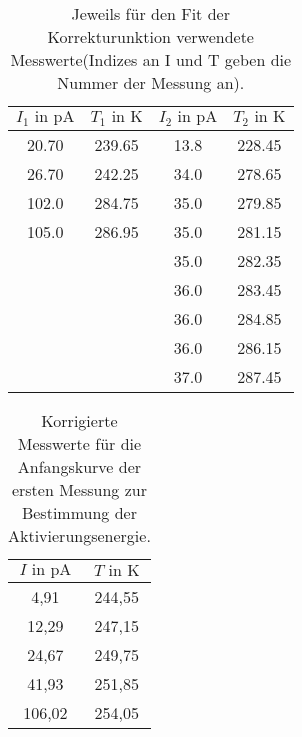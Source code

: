 \FloatBarrier
\begin{table}
  \centering
  \caption{Jeweils für den Fit der Korrekturunktion verwendete Messwerte(Indizes an I und T geben die Nummer der Messung an).}
  \label{tab:korrekturfit}
    \begin{tabular}{c c c c}
      \toprule
      $I_{1} \text{ in } \si{\pico\ampere}$ & $ T_{1} \text{ in } \si{\kelvin} $ & $I_{2} \text{ in } \si{\pico\ampere}$ & $ T_{2} \text{ in } \si{\kelvin} $ \\
      \midrule
      20.70 & 239.65 & 13.8 & 228.45\\
      26.70 & 242.25 & 34.0 & 278.65\\
      102.0 & 284.75 & 35.0 & 279.85\\
      105.0 & 286.95 & 35.0 & 281.15\\
            &        & 35.0 & 282.35\\
            &        & 36.0 & 283.45\\
            &        & 36.0 & 284.85\\
            &        & 36.0 & 286.15\\
            &        & 37.0 & 287.45\\
      \bottomrule
    \end{tabular}
\end{table}


\begin{table}
  \centering
  \caption{Korrigierte Messwerte für die Anfangskurve der ersten Messung zur Bestimmung der Aktivierungsenergie.}
  \label{tab:linfit1}
    \begin{tabular}{c c}
      \toprule
      $I \text{ in } \si{\pico\ampere}$ & $ T \text{ in } \si{\kelvin} $ \\
      \midrule
        4,91 & 244,55\\
       12,29 & 247,15\\
       24,67 & 249,75\\
       41,93 & 251,85\\
      106,02 & 254,05\\
      \bottomrule
    \end{tabular}
\end{table}



